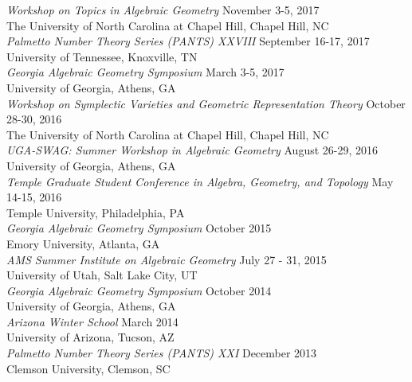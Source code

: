 \documentclass{article}
\begin{document}
  \noindent\textsl{Workshop on Topics in Algebraic Geometry} \hfill November 3-5, 2017\\
  The University of North Carolina at Chapel Hill, Chapel Hill, NC\\
  
  \noindent\textsl{Palmetto Number Theory Series (PANTS) XXVIII} \hfill September 16-17, 2017\\
  University of Tennessee, Knoxville, TN\\
  
  \noindent\textsl{Georgia Algebraic Geometry Symposium} \hfill March 3-5, 2017\\
  University of Georgia, Athens, GA\\

  \noindent\textsl{Workshop on Symplectic Varieties and Geometric Representation Theory} \hfill October 28-30, 2016\\
  The University of North Carolina at Chapel Hill, Chapel Hill, NC\\
  
  \noindent\textsl{UGA-SWAG: Summer Workshop in Algebraic Geometry} \hfill August 26-29, 2016\\
  University of Georgia, Athens, GA\\
  
  \noindent\textsl{Temple Graduate Student Conference in Algebra, Geometry, and Topology} \hfill May 14-15, 2016\\
  Temple University, Philadelphia, PA\\
  
  \noindent\textsl{Georgia Algebraic Geometry Symposium} \hfill October 2015\\
  Emory University, Atlanta, GA\\

  \noindent\textsl{AMS Summer Institute on Algebraic Geometry} \hfill July 27 - 31, 2015\\
  University of Utah, Salt Lake City, UT\\

  \noindent\textsl{Georgia Algebraic Geometry Symposium} \hfill October 2014\\
  University of Georgia, Athens, GA\\

  \noindent\textsl{Arizona Winter School} \hfill March 2014\\
  University of Arizona, Tucson, AZ\\

  \noindent\textsl{Palmetto Number Theory Series (PANTS) XXI} \hfill December 2013\\
  Clemson University, Clemson, SC\\
\end{document}
